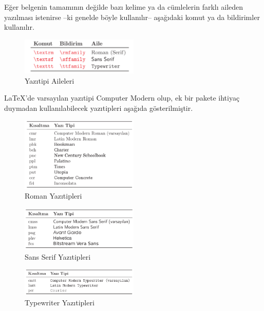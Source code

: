 \documentclass[
  10pt,
]{scrbook}
\theoremstyle{definition}
\theoremstyle{definition}
\theoremstyle{definition}
\theoremstyle{definition}
\theoremstyle{remark}
\begin{document}
Eğer belgenin tamamının değilde bazı kelime ya da cümlelerin farklı aileden yazılması istenirse --ki genelde böyle kullanılır-- aşağıdaki komut ya da bildirimler kullanılır.

\begin{figure}
\centering
\includegraphics[width=0.5\textwidth,height=\textheight]{images/yazitipi.png}
\caption{Yazıtipi Aileleri}
\end{figure}

LaTeX'de varsayılan yazıtipi Computer Modern olup, ek bir pakete ihtiyaç duymadan kullanılabilecek yazıtipleri aşağıda gösterilmiştir.

\begin{figure}
\centering
\includegraphics[width=0.5\textwidth,height=\textheight]{images/yazitipi2.png}
\caption{Roman Yazıtipleri}
\end{figure}

\begin{figure}
\centering
\includegraphics[width=0.5\textwidth,height=\textheight]{images/yazitipi3.png}
\caption{Sans Serif Yazıtipleri}
\end{figure}

\begin{figure}
\centering
\includegraphics[width=0.5\textwidth,height=\textheight]{images/yazitipi4.png}
\caption{Typewriter Yazıtipleri\\
}
\end{figure}
\end{document}

